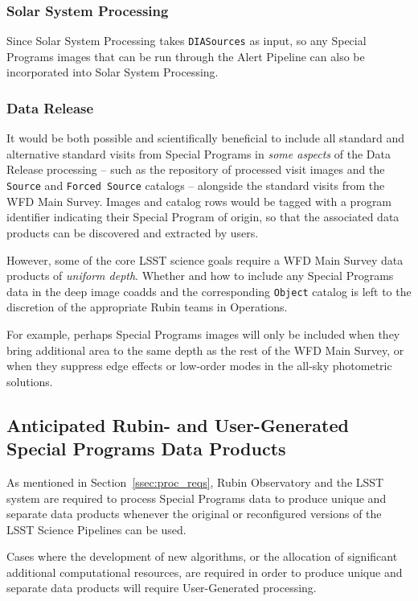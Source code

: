 \documentclass[DM,lsstdoc,toc]{lsstdoc}
\begin{document}
\subsubsection{Solar System Processing}

Since Solar System Processing takes \texttt{DIASources} as input, so any Special Programs images that can be run through the Alert Pipeline can also be incorporated into Solar System Processing.

\subsubsection{Data Release}

It would be both possible and scientifically beneficial to include all standard and alternative standard visits from Special Programs in {\it some aspects} of the Data Release processing -- such as the repository of processed visit images and the {\tt Source} and {\tt Forced Source} catalogs -- alongside the standard visits from the WFD Main Survey.
Images and catalog rows would be tagged with a program identifier indicating their Special Program of origin, so that the associated data products can be discovered and extracted by users.

However, some of the core LSST science goals require a WFD Main Survey data products of {\it uniform depth}.
Whether and how to include any Special Programs data in the deep image coadds and the corresponding {\tt Object} catalog is left to the discretion of the appropriate Rubin teams in Operations.

For example, perhaps Special Programs images will only be included when they bring additional area to the same depth as the rest of the WFD Main Survey, or when they suppress edge effects or low-order modes in the all-sky photometric solutions.


\subsection{Anticipated Rubin- and User-Generated Special Programs Data Products}\label{ssec:proc_spdp}

As mentioned in Section~\ref{ssec:proc_reqs}, Rubin Observatory and the LSST system are required to process Special Programs data to produce unique and separate data products whenever the original or reconfigured versions of the LSST Science Pipelines can be used.

Cases where the development of new algorithms, or the allocation of significant additional computational resources, are required in order to produce unique and separate data products will require User-Generated processing.
\end{document}
